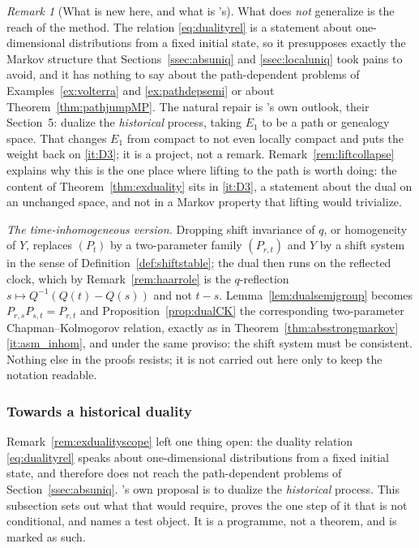 \documentclass[11pt,a4paper]{article}
\theoremstyle{plain}
\theoremstyle{definition}
\theoremstyle{remark}
\newtheorem{remark}[theorem]{Remark}
\newcommand{\DGP}{\cite{DGP24}}
\begin{document}
\begin{remark}[What is new here, and what is \DGP's]
  What does \emph{not} generalize is the reach of the method.  The relation
  \eqref{eq:dualityrel} is a statement about one-dimensional distributions from a
  fixed initial state, so it presupposes exactly the Markov structure that
  Sections~\ref{ssec:absuniq} and \ref{ssec:localuniq} took pains to avoid, and it
  has nothing to say about the path-dependent problems of
  Examples~\ref{ex:volterra} and \ref{ex:pathdepsemi} or about
  Theorem~\ref{thm:pathjumpMP}.  The natural repair is \DGP's own outlook, their
  Section~5: dualize the \emph{historical} process, taking $E_1$ to be a path or
  genealogy space.  That changes $E_1$ from compact to not even locally compact
  and puts the weight back on \ref{it:D3}; it is a project, not a remark.
  Remark~\ref{rem:liftcollapse} explains why this is the one place where lifting
  to the path is worth doing: the content of Theorem~\ref{thm:exduality} sits in
  \ref{it:D3}, a statement about the dual on an unchanged space, and not in a
  Markov property that lifting would trivialize.

  \emph{The time-inhomogeneous version.}  Dropping shift invariance of $q$, or
  homogeneity of $Y$, replaces $(P_t)$ by a two-parameter family $(P_{r,t})$ and
  $Y$ by a shift system in the sense of Definition~\ref{def:shiftstable}; the
  dual then runs on the reflected clock, which by Remark~\ref{rem:haarrole} is the
  $q$-reflection $s \mapsto Q^{-1}(Q(t)-Q(s))$ and not $t-s$.
  Lemma~\ref{lem:dualsemigroup} becomes $P_{r,s}P_{s,t} = P_{r,t}$ and
  Proposition~\ref{prop:dualCK} the corresponding two-parameter
  Chapman--Kolmogorov relation, exactly as in
  Theorem~\ref{thm:absstrongmarkov}\ref{it:asm_inhom}, and under the same
  proviso: the shift system must be consistent.  Nothing else in the proofs resists; it is not
  carried out here only to keep the notation readable.
\end{remark}

\subsubsection*{Towards a historical duality}

Remark~\ref{rem:exdualityscope} left one thing open: the duality relation
\eqref{eq:dualityrel} speaks about one-dimensional distributions from a fixed
initial state, and therefore does not reach the path-dependent problems of
Section~\ref{ssec:absuniq}.  \DGP's own proposal is to dualize the
\emph{historical} process.  This subsection sets out what that would require,
proves the one step of it that is not conditional, and names a test object.  It
is a programme, not a theorem, and is marked as such.
\end{document}

